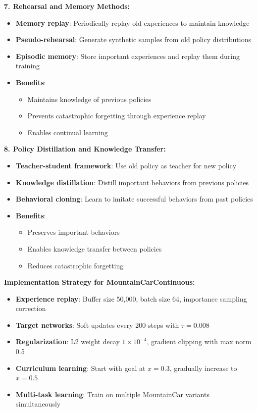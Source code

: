 \documentclass[12pt]{article}
\begin{document}
{{{\textbf{7. Rehearsal and Memory Methods:}
\begin{itemize}
    \item \textbf{Memory replay}: Periodically replay old experiences to maintain knowledge
    \item \textbf{Pseudo-rehearsal}: Generate synthetic samples from old policy distributions
    \item \textbf{Episodic memory}: Store important experiences and replay them during training
    \item \textbf{Benefits}:
    \begin{itemize}
        \item Maintains knowledge of previous policies
        \item Prevents catastrophic forgetting through experience replay
        \item Enables continual learning
    \end{itemize}
\end{itemize}

\textbf{8. Policy Distillation and Knowledge Transfer:}
\begin{itemize}
    \item \textbf{Teacher-student framework}: Use old policy as teacher for new policy
    \item \textbf{Knowledge distillation}: Distill important behaviors from previous policies
    \item \textbf{Behavioral cloning}: Learn to imitate successful behaviors from past policies
    \item \textbf{Benefits}:
    \begin{itemize}
        \item Preserves important behaviors
        \item Enables knowledge transfer between policies
        \item Reduces catastrophic forgetting
    \end{itemize}
\end{itemize}

\textbf{Implementation Strategy for MountainCarContinuous:}
\begin{itemize}
    \item \textbf{Experience replay}: Buffer size 50,000, batch size 64, importance sampling correction
    \item \textbf{Target networks}: Soft updates every 200 steps with $\tau = 0.008$
    \item \textbf{Regularization}: L2 weight decay $1 \times 10^{-4}$, gradient clipping with max norm 0.5
    \item \textbf{Curriculum learning}: Start with goal at $x = 0.3$, gradually increase to $x = 0.5$
    \item \textbf{Multi-task learning}: Train on multiple MountainCar variants simultaneously
\end{itemize}

}}}
\end{document}

